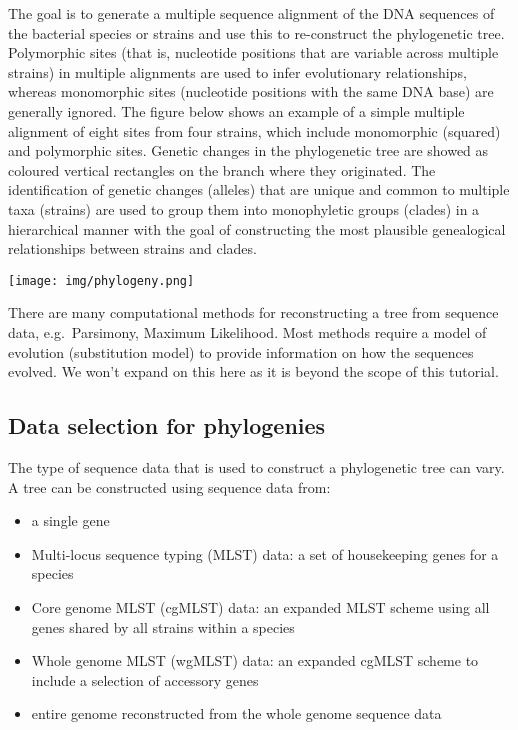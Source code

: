 \documentclass[11pt]{article}
\providecommand{\tightlist}{%
      \setlength{\itemsep}{0pt}\setlength{\parskip}{0pt}}
\begin{document}
The goal is to generate a multiple sequence alignment of the DNA
sequences of the bacterial species or strains and use this to
re-construct the phylogenetic tree. Polymorphic sites (that is,
nucleotide positions that are variable across multiple strains) in
multiple alignments are used to infer evolutionary relationships,
whereas monomorphic sites (nucleotide positions with the same DNA base)
are generally ignored. The figure below shows an example of a simple
multiple alignment of eight sites from four strains, which include
monomorphic (squared) and polymorphic sites. Genetic changes in the
phylogenetic tree are showed as coloured vertical rectangles on the
branch where they originated. The identification of genetic changes
(alleles) that are unique and common to multiple taxa (strains) are used
to group them into monophyletic groups (clades) in a hierarchical manner
with the goal of constructing the most plausible genealogical
relationships between strains and clades.


\begin{center}
\texttt{[image: img/phylogeny.png]}
\end{center}


    There are many computational methods for reconstructing a tree from
sequence data, e.g.~Parsimony, Maximum Likelihood. Most methods require
a model of evolution (substitution model) to provide information on how
the sequences evolved. We won't expand on this here as it is beyond the
scope of this tutorial.

    \hypertarget{data-selection-for-phylogenies}{%
\subsection{Data selection for
phylogenies}\label{data-selection-for-phylogenies}}

The type of sequence data that is used to construct a phylogenetic tree
can vary. A tree can be constructed using sequence data from:

\begin{itemize}
\tightlist
\item
  a single gene
\item
  Multi-locus sequence typing (MLST) data: a set of housekeeping genes
  for a species
\item
  Core genome MLST (cgMLST) data: an expanded MLST scheme using all
  genes shared by all strains within a species
\item
  Whole genome MLST (wgMLST) data: an expanded cgMLST scheme to include
  a selection of accessory genes
\item
  entire genome reconstructed from the whole genome sequence data
\end{itemize}
\end{document}
